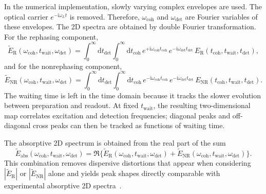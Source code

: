 In the numerical implementation, slowly varying complex envelopes are used. The optical carrier $e^{-\mathrm{i}\omega_{L} t}$ is removed. Therefore, $\omega_{\mathrm{coh}}$ and $\omega_{\mathrm{det}}$ are Fourier variables of these envelopes.
The 2D spectra are obtained by double Fourier transformation. For the rephasing component,
\begin{equation}
	\tilde{E}_{\mathrm{R}}(\omega_{\mathrm{coh}},t_{\mathrm{wait}},\omega_{\mathrm{det}})
	=
	\int_{0}^{\infty}\!\mathrm{d}t_{\mathrm{det}}
	\int_{0}^{\infty}\!\mathrm{d}t_{\mathrm{coh}}\,
	e^{+\mathrm{i}\omega_{\mathrm{coh}} t_{\mathrm{coh}}}\,e^{-\mathrm{i}\omega_{\mathrm{det}} t_{\mathrm{det}}}\,
	E_{\mathrm{R}}(t_{\mathrm{coh}},t_{\mathrm{wait}},t_{\mathrm{det}}),
	\label{eq:SR_def}
\end{equation}
and for the nonrephasing component,
\begin{equation}
	\tilde{E}_{\mathrm{NR}}(\omega_{\mathrm{coh}},t_{\mathrm{wait}},\omega_{\mathrm{det}})
	=
	\int_{0}^{\infty}\!\mathrm{d}t_{\mathrm{det}}
	\int_{0}^{\infty}\!\mathrm{d}t_{\mathrm{coh}}\,
	e^{-\mathrm{i}\omega_{\mathrm{coh}} t_{\mathrm{coh}}}\,e^{-\mathrm{i}\omega_{\mathrm{det}} t_{\mathrm{det}}}\,
	E_{\mathrm{NR}}(t_{\mathrm{coh}},t_{\mathrm{wait}},t_{\mathrm{det}}).
	\label{eq:SNR_def}
\end{equation}
The waiting time is left in the time domain because it tracks the slower evolution between preparation and readout.
At fixed \(t_{\mathrm{wait}}\), the resulting two-dimensional map correlates excitation and detection frequencies; diagonal peaks and off-diagonal cross peaks can then be tracked as functions of waiting time.

The absorptive 2D spectrum is obtained from the real part of the sum
\begin{equation}
	\tilde{E}_{\mathrm{abs}}(\omega_{\mathrm{coh}},t_{\mathrm{wait}},\omega_{\mathrm{det}})
	=
	\Re\Big\{ \tilde{E}_{\mathrm{R}}(\omega_{\mathrm{coh}},t_{\mathrm{wait}},\omega_{\mathrm{det}})
	+
	\tilde{E}_{\mathrm{NR}}(\omega_{\mathrm{coh}},t_{\mathrm{wait}},\omega_{\mathrm{det}}) \Big\}.
\label{eq:Sab_def}
\end{equation}
This combination removes dispersive distortions that appear when considering $|\tilde{E}_{\mathrm{R}}|$ or $|\tilde{E}_{\mathrm{NR}}|$ alone and yields peak shapes directly comparable with experimental absorptive 2D spectra~\cite{jonas2003twodimensionalfemtosecondspectroscopy,fullerogilvie2015experimentalimplementationstwodimensional}.
